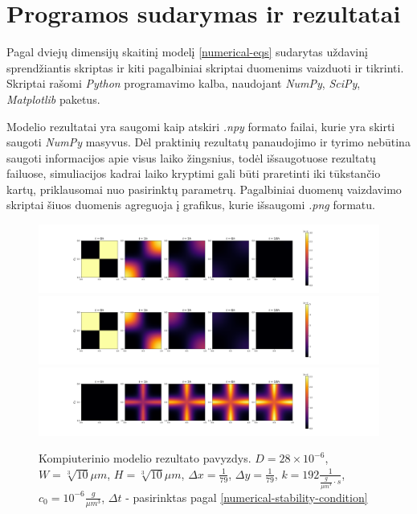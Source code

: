 \section{Programos sudarymas ir rezultatai}

Pagal dviejų dimensijų skaitinį modelį \eqref{numerical-eqs} sudarytas uždavinį sprendžiantis skriptas ir kiti pagalbiniai skriptai duomenims vaizduoti ir tikrinti. Skriptai rašomi \textit{Python} programavimo kalba, naudojant \textit{NumPy}, \textit{SciPy}, \textit{Matplotlib} paketus. 

Modelio rezultatai yra saugomi kaip atskiri \textit{.npy} formato failai, kurie yra skirti saugoti \mbox{\textit{NumPy}} masyvus. Dėl praktinių rezultatų panaudojimo ir tyrimo nebūtina saugoti informacijos apie visus laiko žingsnius, todėl išsaugotuose rezultatų failuose, simuliacijos kadrai laiko kryptimi gali būti praretinti iki tūkstančio kartų, priklausomai nuo pasirinktų parametrų. Pagalbiniai duomenų vaizdavimo skriptai šiuos duomenis agreguoja į grafikus, kurie išsaugomi \textit{.png} formatu.

\begin{figure}[h!]
\centering
\caption{Kompiuterinio modelio rezultato pavyzdys. $D = 28\times 10^{-6}$, $W = \sqrt[3]{10}\mu m$, $H = \sqrt[3]{10}\mu m$, $\Delta x = \frac{1}{79}$, $\Delta y = \frac{1}{79}$, $k = 192 \frac{1}{ \frac{g}{\mu m^3}\cdot s}$, $c_0 = 10^{-6} \frac{g}{\mu m^3}$, $\Delta t$ - pasirinktas pagal \eqref{numerical-stability-condition} }
\includegraphics[width=\textwidth]{../paper/assets/example-0.png} \\
\includegraphics[width=\textwidth]{../paper/assets/example-1.png} \\
\includegraphics[width=\textwidth]{../paper/assets/example-2.png}
\label{result-example}
\end{figure}

